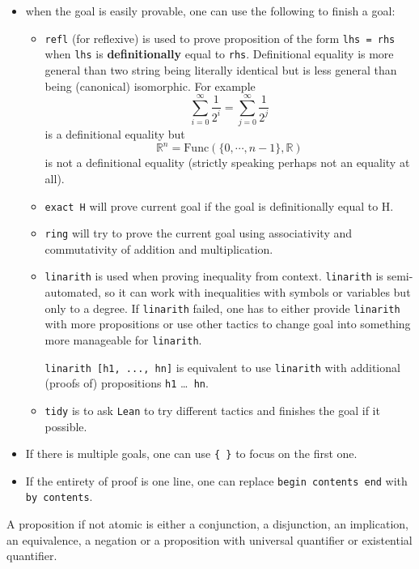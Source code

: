 \documentclass{report}
\theoremstyle{definition}
\begin{document}
\begin{itemize}
  \item when the goal is easily provable, one can use the following to finish a goal:
  \begin{itemize}
    \item {\tt \small refl} (for reflexive) is used to prove proposition of the form {\tt \small lhs = rhs} when {\tt \small lhs} is {\bf definitionally} equal to {\tt \small rhs}. Definitional equality is more general than two string being literally identical but is less general than being (canonical) isomorphic. For example
    $$
  \sum_{i=0}^\infty \frac{1}{2^i}=\sum_{j=0}^\infty \frac{1}{2^j}
    $$
    is a definitional equality but
    $$
  \mathbb R^n = \mathrm{Func}\left(\{0,\cdots, n-1\},\mathbb R\right)
    $$ is not a definitional equality (strictly speaking perhaps not an equality at all).
    \item {\tt \small exact H} will prove current goal if the goal is definitionally equal to H. 
  
    \item {\tt \small ring} will try to prove the current goal using associativity and commutativity of addition and multiplication.
    \item {\tt \small linarith} is used when proving inequality from context. {\tt \small linarith} is semi-automated, so it can work with inequalities with symbols or variables but only to a degree. If {\tt \small linarith} failed, one has to either provide {\tt \small linarith} with more propositions or use other tactics to change goal into something more manageable for {\tt \small linarith}.
  
    {\tt \small linarith [h1, ..., hn]} is equivalent to use {\tt \small linarith} with additional (proofs of) propositions {\tt \small h1} \dots {\tt \small { hn}}.
    \item {\tt \small tidy} is to ask {\tt \small Lean} to try different tactics and finishes the goal if it possible.
  \end{itemize}

  \item If there is multiple goals, one can use {\tt \small \{ \}} to focus on the first one.
  \item If the entirety of proof is one line, one can replace {\tt \small begin contents end} with {\tt \small by contents}.
\end{itemize}


A proposition if not atomic is either a conjunction, a disjunction, an implication, an equivalence, a negation or a proposition with universal quantifier or existential quantifier.
\end{document}

